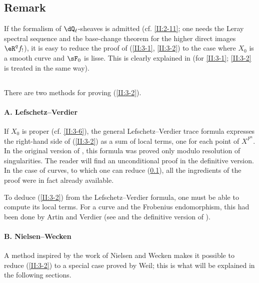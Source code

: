 \subsection{Remark}\label{II:3-7}

If the formalism of $\dQ_\ell$-sheaves is admitted (cf. \ref{II:2-11}; one
needs the Leray spectral sequence and the base-change theorem for the higher
direct images $\eR^q f_!$), it is easy to reduce the proof of
(\ref{II:3-1}, \ref{II:3-2}) to the case where $X_0$ is a smooth curve and
$\sF_0$ is lisse. This is clearly explained in  (for
\ref{II:3-1}; \ref{II:3-2} is treated in the same way).






\subsection{}\label{II:3-8}

There are two methods for proving (\ref{II:3-2}).



\paragraph{A. Lefschetz--Verdier}
If $X_0$ is proper (cf. \ref{II:3-6}), the general Lefschetz--Verdier trace
formula expresses the right-hand side of (\ref{II:3-2}) as a sum of local
terms, one for each point of $X^{F^n}$. In the original version of
, this formula was proved only modulo resolution of singularities.
The reader will find an unconditional proof in the definitive version. In
the case of curves, to which one can reduce (\ref{II:3-7}), all the
ingredients of the proof were in fact already available.

To deduce (\ref{II:3-2}) from the Lefschetz--Verdier formula, one must be
able to compute its local terms. For a curve and the Frobenius endomorphism,
this had been done by Artin and Verdier (see  and the definitive version of ).



\paragraph{B. Nielsen--Wecken}
A method inspired by the work of Nielsen and Wecken makes it possible to
reduce (\ref{II:3-2}) to a special case proved by Weil; this is what will be
explained in the following sections.











